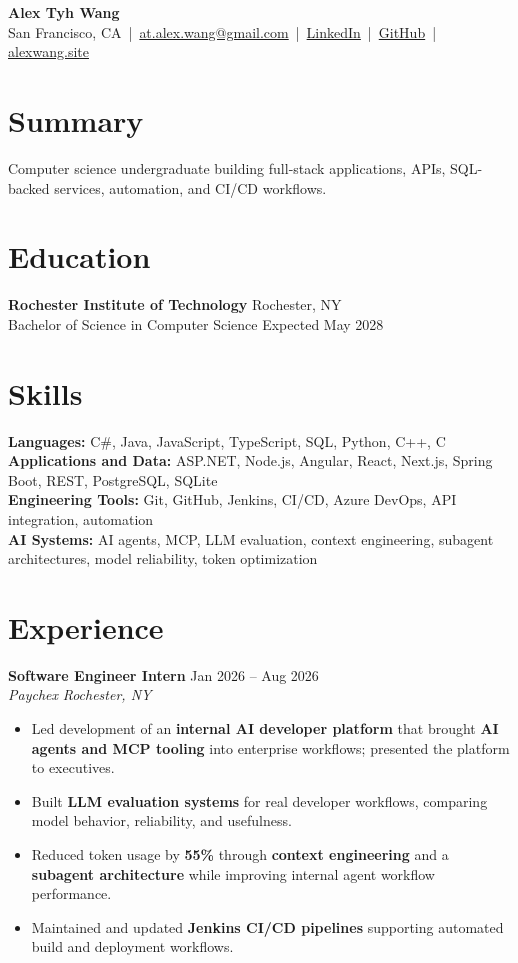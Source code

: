 \documentclass[10pt,letterpaper]{article}
\newif\ifresumeFirstRole
\newcommand{\resumeRole}[4]{%
  \ifresumeFirstRole
    \global\resumeFirstRolefalse
  \else
    \vspace{0pt plus 1fill}%
  \fi
  \textbf{#1} \hfill #2\\
  \textit{#3} \hfill \textit{#4}
}
\begin{document}
\begin{center}
{\Large \textbf{Alex Tyh Wang}}\\
San Francisco, CA \,|\, \href{mailto:at.alex.wang@gmail.com}{at.alex.wang@gmail.com} \,|\, \href{https://www.linkedin.com/in/alex-tyh-wang/}{LinkedIn} \,|\, \href{https://github.com/alextyhwang}{GitHub} \,|\, \href{https://alexwang.site}{alexwang.site}
\end{center}

\section*{Summary}
Computer science undergraduate building full-stack applications, APIs, SQL-backed services, automation, and CI/CD workflows.

\section*{Education}
\textbf{Rochester Institute of Technology} \hfill Rochester, NY\\
Bachelor of Science in Computer Science \hfill Expected May 2028

\section*{Skills}
\textbf{Languages:} C\#, Java, JavaScript, TypeScript, SQL, Python, C++, C\\
\textbf{Applications and Data:} ASP.NET, Node.js, Angular, React, Next.js, Spring Boot, REST, PostgreSQL, SQLite\\
\textbf{Engineering Tools:} Git, GitHub, Jenkins, CI/CD, Azure DevOps, API integration, automation\\
\textbf{AI Systems:} AI agents, MCP, LLM evaluation, context engineering, subagent architectures, model reliability, token optimization

\section*{Experience}
\resumeRole{Software Engineer Intern}{Jan 2026 -- Aug 2026}{Paychex}{Rochester, NY}
\begin{itemize}
  \item Led development of an \textbf{internal AI developer platform} that brought \textbf{AI agents and MCP tooling} into enterprise workflows; presented the platform to executives.
  \item Built \textbf{LLM evaluation systems} for real developer workflows, comparing model behavior, reliability, and usefulness.
  \item Reduced token usage by \textbf{55\%} through \textbf{context engineering} and a \textbf{subagent architecture} while improving internal agent workflow performance.
  \item Maintained and updated \textbf{Jenkins CI/CD pipelines} supporting automated build and deployment workflows.
\end{itemize}
\end{document}
